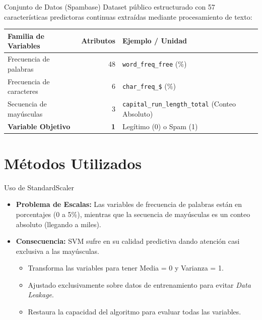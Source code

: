 \documentclass[10pt]{beamer}
\begin{document}
\begin{frame}{Conjunto de Datos (Spambase)}
  Dataset público estructurado con 57 características predictoras continuas extraídas mediante procesamiento de texto:
  \vspace{0.3cm}
  \begin{table}
    \centering
    \small
    \begin{tabular}{@{}lrp{5cm}@{}}
      \toprule
      \textbf{Familia de Variables} & \textbf{Atributos} & \textbf{Ejemplo / Unidad} \\
      \midrule
      Frecuencia de palabras & 48 & \texttt{word\_freq\_free} (\%) \\
      Frecuencia de caracteres & 6 & \texttt{char\_freq\_\$} (\%) \\
      Secuencia de mayúsculas & 3 & \texttt{capital\_run\_length\_total} (Conteo Absoluto) \\
      \midrule
      \textbf{Variable Objetivo} & \textbf{1} & Legítimo (0) o Spam (1) \\
      \bottomrule
    \end{tabular}
  \end{table}
\end{frame}
\section{Métodos Utilizados}



\begin{frame}{Uso de StandardScaler}
  \begin{itemize}
    \item \textbf{Problema de Escalas:} Las variables de frecuencia de palabras están en porcentajes (0 a 5\%), mientras que la secuencia de mayúsculas es un conteo absoluto (llegando a miles).
    \item \textbf{Consecuencia:} SVM sufre en su calidad predictiva dando atención casi exclusiva a las mayúsculas.
    \begin{itemize}
        \item Transforma las variables para tener Media = 0 y Varianza = 1.
        \item Ajustado exclusivamente sobre datos de entrenamiento para evitar \textit{Data Leakage}.
        \item Restaura la capacidad del algoritmo para evaluar todas las variables.
    \end{itemize}
  \end{itemize}
\end{frame}
\end{document}
